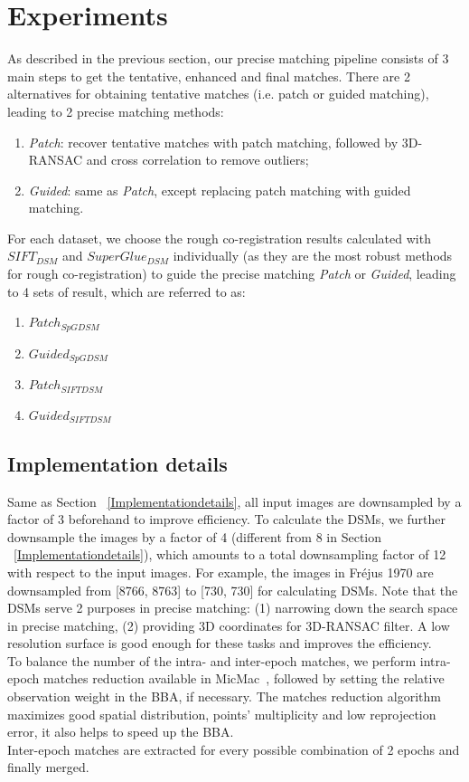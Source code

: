 \section{Experiments}
As described in the previous section, our precise matching pipeline consists of 3 main steps to get the tentative, enhanced and final matches. There are 2 alternatives for obtaining tentative matches (i.e. patch or guided matching), leading to 2 precise matching methods:\\
\begin{enumerate}
	\item \textit{Patch}: recover tentative matches with patch matching, followed by 3D-RANSAC and cross correlation to remove outliers;
	\item \textit{Guided}: same as \textit{Patch}, except replacing patch matching with guided matching.
\end{enumerate}
For each dataset, we choose the rough co-registration results calculated with $SIFT_{DSM}$ and $SuperGlue_{DSM}$ individually (as they are the most robust methods for rough co-registration) to guide the precise matching \textit{Patch} or \textit{Guided}, leading to 4 sets of result, which are referred to as:\\
\begin{enumerate}
	\item $Patch_{SpGDSM}$
	\item $Guided_{SpGDSM}$
	\item $Patch_{SIFTDSM}$
	\item $Guided_{SIFTDSM}$
\end{enumerate}

\subsection{Implementation details}
Same as Section ~\ref{Implementationdetails}, all input images are downsampled by a factor of 3 beforehand to improve efficiency. To calculate the DSMs, we further downsample the images by a factor of 4 (different from 8 in Section ~\ref{Implementationdetails}), which amounts to a total downsampling factor of 12 with respect to the input images. For example, the images in Fr{\'e}jus 1970 are downsampled from [8766, 8763] to [730, 730] for calculating DSMs. 
Note that the DSMs serve 2 purposes in precise matching: (1) narrowing down the search space in precise matching, (2) providing 3D coordinates for 3D-RANSAC filter. A low resolution surface is good enough for these tasks and improves the efficiency.\\
To balance the number of the intra- and inter-epoch matches, we perform intra-epoch matches reduction available in MicMac~\cite{marc2016micmac}, followed by setting the relative observation weight in the \ac{BBA}, if necessary. The matches reduction algorithm maximizes good spatial distribution, points' multiplicity and low reprojection error, it also helps to speed up the \ac{BBA}.\\
Inter-epoch matches are extracted {for every possible combination of 2 epochs and finally merged}.\\


